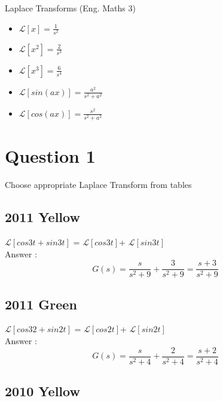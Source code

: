 Laplace Transforms (Eng. Maths 3)

\begin{itemize}
\item $\mathcal{L}[x] = \frac{1}{s^2}$
\item $\mathcal{L}[x^2] = \frac{2}{s^3}$
\item $\mathcal{L}[x^3] = \frac{6}{s^4}$
\item $\mathcal{L}[sin(ax)] = \frac{a^2}{s^2 + a^2}$
\item $\mathcal{L}[cos(ax)] = \frac{s^2}{s^2 + a^2}$
\end{itemize}


\section{Question 1}
Choose appropriate Laplace Transform from tables
\subsection{2011 Yellow}
$\mathcal{L}[cos3t + sin3t]$ = $\mathcal{L}[cos3t]$+ $\mathcal{L}[sin3t]$\\
Answer : \[ G(s) = \frac{s}{s^2+9}+\frac{3}{s^2+9}= \frac{s+3}{s^2+9}\]
\subsection{2011 Green}
$\mathcal{L}[cos32 + sin2t]$ = $\mathcal{L}[cos2t]$+ $\mathcal{L}[sin2t]$ \\

Answer : \[ G(s) = \frac{s}{s^2+4}+\frac{2}{s^2+4}= \frac{s+2}{s^2+4}\]

\subsection{2010 Yellow}

